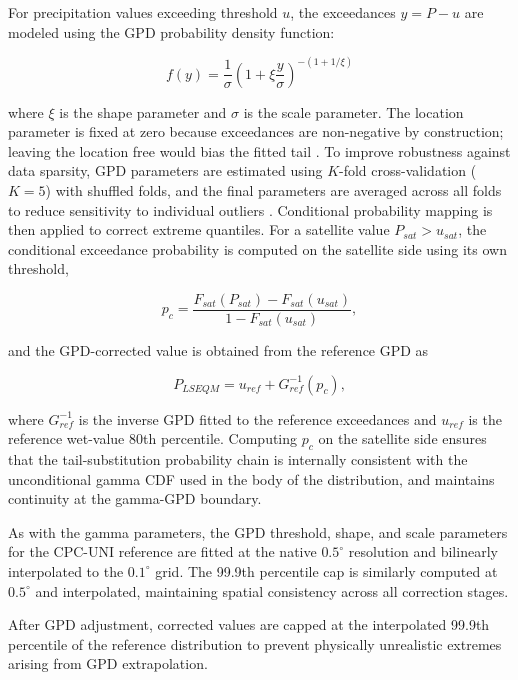 \documentclass[11pt,a4paper]{article}
\begin{document}
For precipitation values exceeding threshold \(u\), the exceedances
\(y = P - u\) are modeled using the GPD probability density function:

\begin{equation}f(y) = \frac{1}{\sigma} \left( 1 + \xi \frac{y}{\sigma} \right)^{-(1 + 1/\xi)}\end{equation}

where \(\xi\) is the shape parameter and \(\sigma\) is the scale
parameter. The location parameter is fixed at zero because exceedances
are non-negative by construction; leaving the location free would bias
the fitted tail \cite{ref7}. To improve robustness against data sparsity,
GPD parameters are estimated using \(K\)-fold cross-validation
(\(K = 5\)) with shuffled folds, and the final parameters are averaged
across all folds to reduce sensitivity to individual outliers \cite{ref25}.
Conditional probability mapping is then applied to correct extreme
quantiles. For a satellite value \(P_{sat} > u_{sat}\), the conditional
exceedance probability is computed on the satellite side using its own
threshold,

\begin{equation}p_c = \frac{F_{sat}(P_{sat}) - F_{sat}(u_{sat})}{1 - F_{sat}(u_{sat})},\end{equation}

and the GPD-corrected value is obtained from the reference GPD as

\begin{equation}P_{LSEQM} = u_{ref} + G_{ref}^{-1}(p_c),\end{equation}

where \(G_{ref}^{-1}\) is the inverse GPD fitted to the reference
exceedances and \(u_{ref}\) is the reference wet-value 80th percentile.
Computing \(p_c\) on the satellite side ensures that the
tail-substitution probability chain is internally consistent with the
unconditional gamma CDF used in the body of the distribution, and
maintains continuity at the gamma-GPD boundary.

As with the gamma parameters, the GPD threshold, shape, and scale
parameters for the CPC-UNI reference are fitted at the native
\(0.5^{\circ}\) resolution and bilinearly interpolated to the
\(0.1^{\circ}\) grid. The 99.9th percentile cap is similarly computed at
\(0.5^{\circ}\) and interpolated, maintaining spatial consistency across
all correction stages.

After GPD adjustment, corrected values are capped at the interpolated
99.9th percentile of the reference distribution to prevent physically
unrealistic extremes arising from GPD extrapolation.
\end{document}
